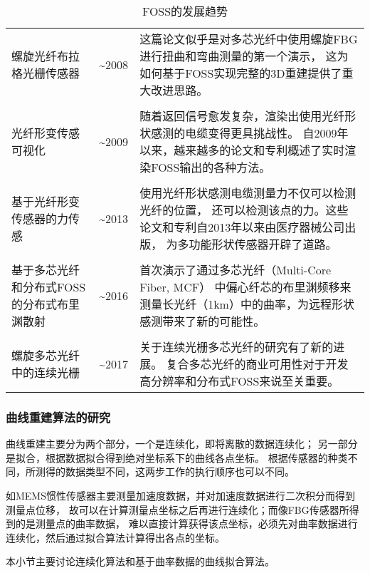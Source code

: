 \begin{table}[!htbp]
\begin{center}
\begin{tabular}{p{}cp{}}
\\
螺旋光纤布拉格光栅传感器 & \textasciitilde 2008 & 这篇论文似乎是对多芯光纤中使用螺旋FBG进行扭曲和弯曲测量的第一个演示，
这为如何基于FOSS实现完整的3D重建提供了重大改进思路。
\\
\\
光纤形变传感可视化 & \textasciitilde 2009 & 随着返回信号愈发复杂，渲染出使用光纤形状感测的电缆变得更具挑战性。
自2009年以来，越来越多的论文和专利概述了实时渲染FOSS输出的各种方法。
\\
\\
基于光纤形变传感器的力传感 & \textasciitilde 2013 & 使用光纤形状感测电缆测量力不仅可以检测光纤的位置，
还可以检测该点的力。这些论文和专利自2013年以来由医疗器械公司出版，
为多功能形状传感器开辟了道路。
\\
\\
基于多芯光纤和分布式FOSS的分布式布里渊散射 & \textasciitilde 2016 & 首次演示了通过多芯光纤（Multi-Core Fiber, MCF）
中偏心纤芯的布里渊频移来测量长光纤（1km）中的曲率，为远程形状感测带来了新的可能性。
\\
\\
螺旋多芯光纤中的连续光栅 & \textasciitilde 2017 & 关于连续光栅多芯光纤的研究有了新的进展。
复合多芯光纤的商业可用性对于开发高分辨率和分布式FOSS来说至关重要。
\\
\bottomrule
\end{tabular}
\end{center}
\caption{FOSS的发展趋势\cite{recent-dev-in-foss}}
\label{table:foss}
\end{table}

\subsubsection{曲线重建算法的研究}
曲线重建主要分为两个部分，一个是连续化，即将离散的数据连续化；
另一部分是拟合，根据数据拟合得到绝对坐标系下的曲线各点坐标。
根据传感器的种类不同，所测得的数据类型不同，这两步工作的执行顺序也可以不同。

如MEMS惯性传感器主要测量加速度数据，并对加速度数据进行二次积分而得到测量点位移，
故可以在计算测量点坐标之后再进行连续化；而像FBG传感器所得到的是测量点的曲率数据，
难以直接计算获得该点坐标，必须先对曲率数据进行连续化，然后通过拟合算法计算得出各点的坐标。

本小节主要讨论连续化算法和基于曲率数据的曲线拟合算法。

